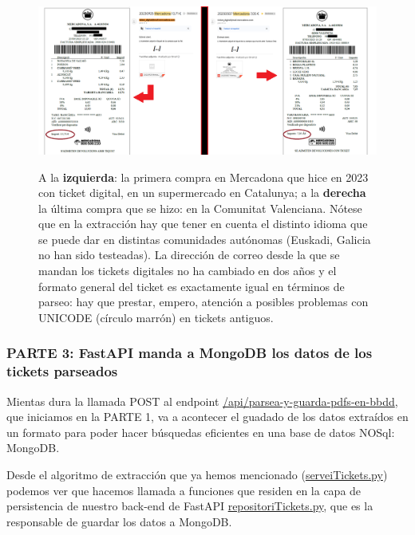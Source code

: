 \documentclass[a4paper,12pt]{report}
\begin{document}
		
		
		\FloatBarrier
		\setlength{\belowcaptionskip}{3pt}
		\begin{figure}[H]
			\centering
			\caption{A la \textbf{izquierda}: la primera compra en Mercadona que hice en 2023 con ticket digital, en un supermercado en Catalunya; a la \textbf{derecha} la última compra que se hizo: en la Comunitat Valenciana. Nótese que en la extracción hay que tener en cuenta el distinto idioma que se puede dar en distintas comunidades autónomas (Euskadi, Galicia no han sido testeadas). La dirección de correo desde la que se mandan los tickets digitales no ha cambiado en dos años y el formato general del ticket es exactamente igual en términos de parseo: hay que prestar, empero, atención a posibles problemas con UNICODE (círculo marrón) en tickets antiguos.}
			\includegraphics[width=1\linewidth]{img/primerIultimTiketMeuCorreu}
			\label{fig:primerIultimTiketMeuCorreu}
		\end{figure}
		\FloatBarrier
		
		
	
		
		\subsubsection{PARTE 3: FastAPI manda a MongoDB los datos de los tickets parseados}
		\label{sec:PARTE3_FASTAPI}
		
		
		Mientas dura la llamada POST al endpoint \href{https://github.com/blackcub3s/mercApp/blob/f5413ed8cf7ed88c5ed18299564b836d27c52bd4/APP%20WEB/__FastAPI__/app/controlador.py#L132-L152}{/api/parsea-y-guarda-pdfs-en-bbdd}, que iniciamos en la PARTE 1, va a acontecer el guadado de los datos extraídos en un formato para poder hacer búsquedas eficientes en una base de datos NOSql: MongoDB.
		
		Desde el algoritmo de extracción que ya hemos mencionado (\href{https://github.com/blackcub3s/mercApp/blob/main/APP%20WEB/__FastAPI__/app/serveiTickets.py}{serveiTickets.py}) podemos ver que hacemos llamada a funciones que residen en la capa de persistencia de nuestro back-end de FastAPI \href{https://github.com/blackcub3s/mercApp/blob/main/APP%20WEB/__FastAPI__/app/repositoriTickets.py}{repositoriTickets.py}, que es la responsable de guardar los datos a MongoDB.
		
\end{document}
